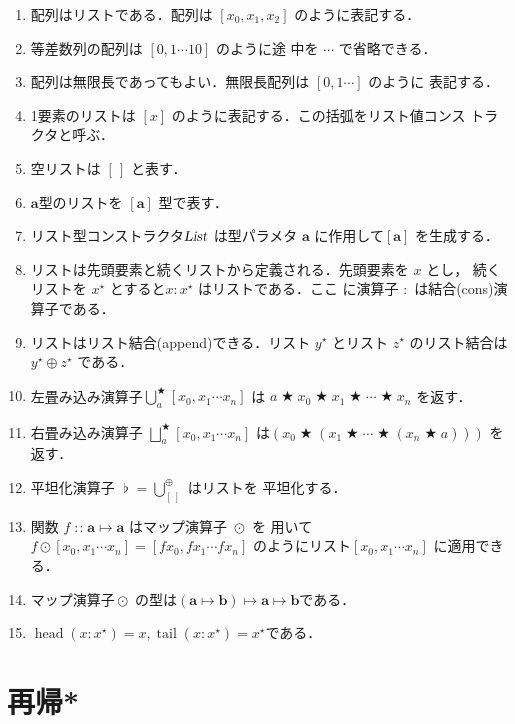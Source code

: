 \documentclass[a5paper,twoside,fleqn,draft]{jsbook}
\newcommand{\mEmptyList}{{[\,]}}
\newcommand{\mSpecialFunc}[1]{#1}
\DeclareMathOperator{\mHead}{\mSpecialFunc{head}}
\DeclareMathOperator{\mTail}{\mSpecialFunc{tail}}
\DeclareMathOperator{\mAppend}{\oplus}
\DeclareMathOperator{\mBinOp}{\bigstar}
\DeclareMathOperator*{\mFold}{\bigcup}
\DeclareMathOperator*{\mFoldRight}{\bigsqcup}
\DeclareMathOperator{\mFuncArrow}{\mapsto}
\DeclareMathOperator{\mIn}{{:\!:}}
\DeclareMathOperator{\mJoinList}{\flat} %
\DeclareMathOperator{\mMapList}{\odot}
\newcommand{\mType}[1]{\mathbf{#1}} %
\newcommand{\mA}{\mType{a}}
\newcommand{\mB}{\mType{b}}
\newcommand{\mTypeConstructor}[1]{\textsl{#1}}
\DeclareMathOperator{\mListTypeConstructor}{\mTypeConstructor{List}}
\newcommand{\mList}[1]{{#1}^\mathrm{\star}}
\newcommand{\mProjEXP}[2]{#1\mFuncArrow#2} %
\begin{document}
\begin{enumerate}
\item 配列はリストである．配列は $[x_0,x_1,x_2]$ のように表記する．
\item 等差数列の配列は $[0,1\dotsb10]$ のように途
  中を $\dotsb$ で省略できる．
\item 配列は無限長であってもよい．無限長配列は $[0,1\dotsb]$ のように
  表記する．
\item 1要素のリストは $[x]$ のように表記する．この括弧をリスト値コンス
  トラクタと呼ぶ．
\item 空リストは $\mEmptyList$ と表す．
\item $\mA $型のリストを $[\mA]$ 型で表す．
\item リスト型コンストラクタ$\mListTypeConstructor$ は型パラメタ $\mA
  $ に作用して$[\mA]$ を生成する．
\item リストは先頭要素と続くリストから定義される．先頭要素を $x$ とし，
  続くリストを $\mList{x}$ とすると$x:\mList{x}$ はリストである．ここ
  に演算子 $:$ は結合(cons)演算子である．
\item リストはリスト結合(append)できる．リスト $\mList{y}$ とリスト
  $\mList{z}$ のリスト結合は $\mList{y}\mAppend\mList{z}$ である．
\item 左畳み込み演算子$\mFold^{\mBinOp}_a[x_0,x_1\dotsb x_n]$ は
  $a\mBinOp x_0\mBinOp x_1\mBinOp\dotsb\mBinOp x_n$ を返す．
\item 右畳み込み演算子 $\mFoldRight^{\mBinOp}_{a}[x_0,x_1\dotsb x_n]$
  は$(x_0\mBinOp(x_1\mBinOp\dotsb\mBinOp(x_n\mBinOp a)))$ を返す．
\item 平坦化演算子 $\mJoinList=\mFold_\mEmptyList^{\mAppend}$ はリストを
  平坦化する．
\item 関数 $f\mIn\mProjEXP{\mA }{\mA }$ はマップ演算子 $\mMapList$ を
  用いて $f\mMapList[x_0,x_1\dotsb x_n]=[fx_0,fx_1\dotsb
    fx_n]$ のようにリスト$[x_0,x_1\dotsb x_n]$ に適用できる．
\item マップ演算子$\mMapList$ の型は$\mProjEXP{(\mProjEXP{\mA }{\mB
  })}{\mProjEXP{\mA }{\mB }}$である．
\item $\mHead(x:\mList{x})=x,\mTail(x:\mList{x})=\mList{x}$である．
\end{enumerate}


\chapter{再帰*}
\label{ch:recursion}
\end{document}
